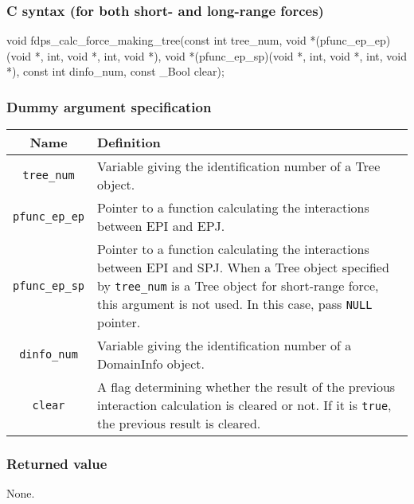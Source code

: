 \clearpage

\subsubsection*{C syntax (for both short- and long-range forces)}
\begin{screen}
\begin{spverbatim}
void fdps_calc_force_making_tree(const int tree_num,
                                 void *(pfunc_ep_ep)(void *, int, void *, int, void *),
                                 void *(pfunc_ep_sp)(void *, int, void *, int, void *),
                                 const int dinfo_num,
                                 const _Bool clear);
\end{spverbatim}
\end{screen}

\subsubsection*{Dummy argument specification}
\begin{table}[h]
\begin{tabularx}{\linewidth}{cX}
\toprule
\rowcolor{Snow2}
Name & Definition \\
\midrule
\verb|tree_num|    & Variable giving the identification number of a Tree object.\\
\verb|pfunc_ep_ep| & Pointer to a function calculating the interactions between EPI and EPJ.\\
\verb|pfunc_ep_sp| & Pointer to a function calculating the interactions between EPI and SPJ. When a Tree object specified by \verb|tree_num| is a Tree object for short-range force, this argument is not used. In this case, pass \texttt{NULL} pointer.\\
\verb|dinfo_num|   & Variable giving the identification number of a DomainInfo object.\\
\verb|clear|       & A flag determining whether the result of the previous interaction calculation is cleared or not. If it is \texttt{true}, the previous result is cleared.\\
\bottomrule
\end{tabularx}
\end{table}

\subsubsection*{Returned value}
None.


